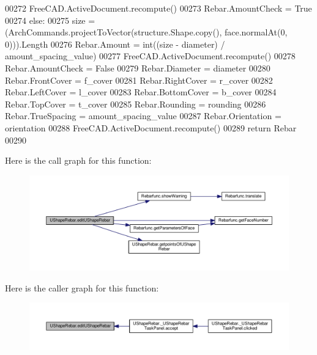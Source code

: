 \begin{DoxyCode}
00272         FreeCAD.ActiveDocument.recompute()
00273         Rebar.AmountCheck = \textcolor{keyword}{True}
00274     \textcolor{keywordflow}{else}:
00275         size = (ArchCommands.projectToVector(structure.Shape.copy(), face.normalAt(0, 0))).Length
00276         Rebar.Amount = int((size - diameter) / amount\_spacing\_value)
00277         FreeCAD.ActiveDocument.recompute()
00278         Rebar.AmountCheck = \textcolor{keyword}{False}
00279     Rebar.Diameter = diameter
00280     Rebar.FrontCover = f\_cover
00281     Rebar.RightCover = r\_cover
00282     Rebar.LeftCover = l\_cover
00283     Rebar.BottomCover = b\_cover
00284     Rebar.TopCover = t\_cover
00285     Rebar.Rounding = rounding
00286     Rebar.TrueSpacing = amount\_spacing\_value
00287     Rebar.Orientation = orientation
00288     FreeCAD.ActiveDocument.recompute()
00289     \textcolor{keywordflow}{return} Rebar
00290 
\end{DoxyCode}


Here is the call graph for this function\+:\nopagebreak
\begin{figure}[H]
\begin{center}
\leavevmode
\includegraphics[width=350pt]{namespaceUShapeRebar_a461f60869fd97a93fc015af4828467ee_cgraph}
\end{center}
\end{figure}




Here is the caller graph for this function\+:\nopagebreak
\begin{figure}[H]
\begin{center}
\leavevmode
\includegraphics[width=350pt]{namespaceUShapeRebar_a461f60869fd97a93fc015af4828467ee_icgraph}
\end{center}
\end{figure}


